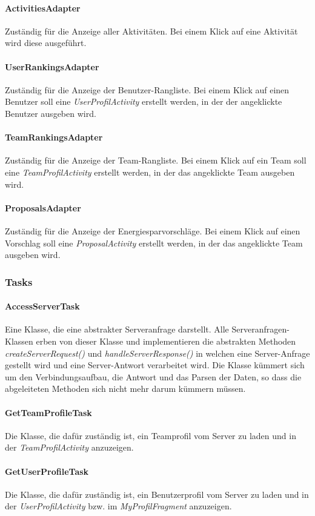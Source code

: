 \paragraph{ActivitiesAdapter} Zuständig für die Anzeige aller Aktivitäten. Bei einem Klick auf eine Aktivität wird diese ausgeführt.
\paragraph{UserRankingsAdapter} Zuständig für die Anzeige der Benutzer-Rangliste. Bei einem Klick auf einen Benutzer soll eine \emph{UserProfilActivity} erstellt werden, in der der angeklickte Benutzer ausgeben wird.
\paragraph{TeamRankingsAdapter} Zuständig für die Anzeige der Team-Rangliste. Bei einem Klick auf ein Team soll eine \emph{TeamProfilActivity} erstellt werden, in der das angeklickte Team ausgeben wird.
\paragraph{ProposalsAdapter} Zuständig für die Anzeige der Energiesparvorschläge. Bei einem Klick auf einen Vorschlag soll eine \emph{ProposalActivity} erstellt werden, in der das angeklickte Team ausgeben wird.

\subsubsection{Tasks}
\paragraph{AccessServerTask} Eine Klasse, die eine abstrakter Serveranfrage darstellt. Alle Serveranfragen-Klassen erben von dieser Klasse und implementieren die abstrakten Methoden \emph{createServerRequest()} und \emph{handleServerResponse()} in welchen eine Server-Anfrage gestellt wird und eine Server-Antwort verarbeitet wird. Die Klasse kümmert sich um den Verbindungsaufbau, die Antwort und das Parsen der Daten, so dass die abgeleiteten Methoden sich nicht mehr darum kümmern müssen.
\paragraph{GetTeamProfileTask} Die Klasse, die dafür zuständig ist, ein Teamprofil vom Server zu laden und in der \emph{TeamProfilActivity} anzuzeigen.
\paragraph{GetUserProfileTask} Die Klasse, die dafür zuständig ist, ein Benutzerprofil vom Server zu laden und in der \emph{UserProfilActivity} bzw. im \emph{MyProfilFragment} anzuzeigen.
